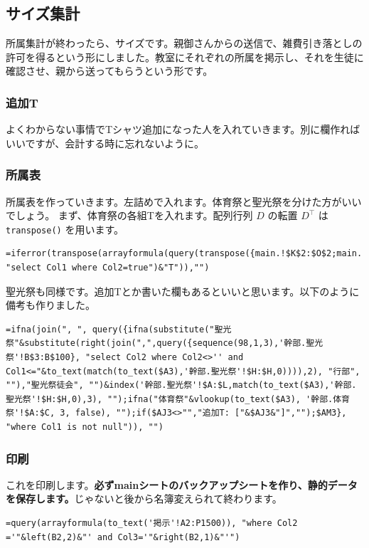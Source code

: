 \documentclass[a4paper]{ltjsreport}
\begin{document}
\subsection{サイズ集計}
所属集計が終わったら、サイズです。親御さんからの送信で、雑費引き落としの許可を得るという形にしました。教室にそれぞれの所属を掲示し、それを生徒に確認させ、親から送ってもらうという形です。

\subsubsection{追加T}
よくわからない事情でTシャツ追加になった人を入れていきます。別に欄作ればいいですが、会計する時に忘れないように。

\subsubsection{所属表}
所属表を作っていきます。左詰めで入れます。体育祭と聖光祭を分けた方がいいでしょう。
まず、体育祭の各組Tを入れます。配列行列 $D$ の転置 $D^\top$ は \texttt{transpose()} を用います。

\begin{lstlisting}
=iferror(transpose(arrayformula(query(transpose({main.!$K$2:$O$2;main.!$K3:$O3}), "select Col1 where Col2=true")&"T")),"")
\end{lstlisting}

聖光祭も同様です。追加Tとか書いた欄もあるといいと思います。以下のように備考も作りました。

\begin{lstlisting}
=ifna(join(", ", query({ifna(substitute("聖光祭"&substitute(right(join(",",query({sequence(98,1,3),'幹部.聖光祭'!B$3:B$100}, "select Col2 where Col2<>'' and Col1<="&to_text(match(to_text($A3),'幹部.聖光祭'!$H:$H,0)))),2), "行部", ""),"聖光祭徒会", "")&index('幹部.聖光祭'!$A:$L,match(to_text($A3),'幹部.聖光祭'!$H:$H,0),3), "");ifna("体育祭"&vlookup(to_text($A3), '幹部.体育祭'!$A:$C, 3, false), "");if($AJ3<>"","追加T: ["&$AJ3&"]","");$AM3}, "where Col1 is not null")), "")
\end{lstlisting}

\subsubsection{印刷}
これを印刷します。\textbf{必ずmainシートのバックアップシートを作り、静的データを保存します。}じゃないと後から名簿変えられて終わります。

\begin{lstlisting}
=query(arrayformula(to_text('掲示'!A2:P1500)), "where Col2 ='"&left(B2,2)&"' and Col3='"&right(B2,1)&"'")
\end{lstlisting}
\end{document}
